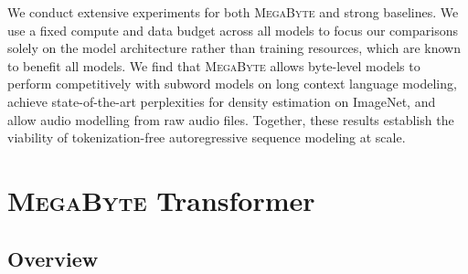 \documentclass{article}
\newcommand{\fastslow}[0]{\textsc{MegaByte}\xspace}
\newcommand{\megabyte}[0]{\fastslow}
\theoremstyle{plain}
\theoremstyle{definition}
\theoremstyle{remark}
\begin{document}
We conduct extensive experiments for both \fastslow and strong baselines. We use a fixed compute and data budget across all models 
to focus our comparisons solely on the model architecture rather than training resources, which are known to benefit all models. We find that \fastslow allows byte-level models to perform competitively with subword models on long context language modeling, achieve state-of-the-art perplexities for density estimation on ImageNet, and allow audio modelling from raw audio files. Together, these results establish the viability of tokenization-free autoregressive sequence modeling at scale.

\section{\megabyte Transformer}
\subsection{Overview}
\label{sec:fastslow}






\end{document}
